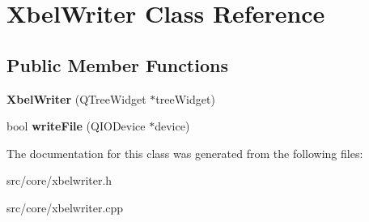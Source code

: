 \hypertarget{classXbelWriter}{
\section{XbelWriter Class Reference}
\label{classXbelWriter}
}
\subsection*{Public Member Functions}
\begin{DoxyCompactItemize}
\item 
\hypertarget{classXbelWriter_ae5da6c9f8623a1a95dcf2b209cb4905a}{
{\bfseries XbelWriter} (QTreeWidget $\ast$treeWidget)}
\label{classXbelWriter_ae5da6c9f8623a1a95dcf2b209cb4905a}

\item 
\hypertarget{classXbelWriter_a086bc7893073af5bec5108e08280c623}{
bool {\bfseries writeFile} (QIODevice $\ast$device)}
\label{classXbelWriter_a086bc7893073af5bec5108e08280c623}

\end{DoxyCompactItemize}


The documentation for this class was generated from the following files:\begin{DoxyCompactItemize}
\item 
src/core/xbelwriter.h\item 
src/core/xbelwriter.cpp\end{DoxyCompactItemize}
